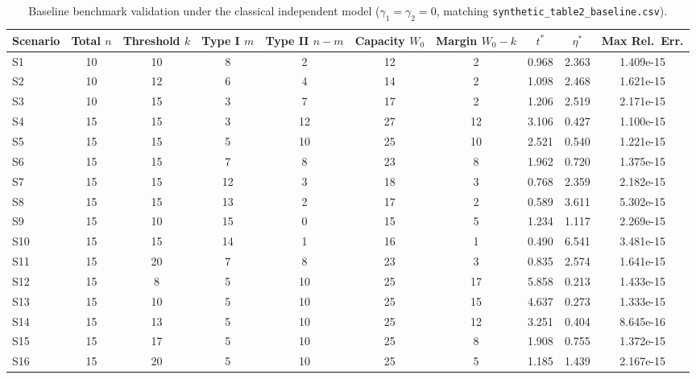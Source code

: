 \documentclass[10pt,a4paper]{article}
\begin{document}
\begin{table}[htbp]
\centering
\footnotesize
\caption{Baseline benchmark validation under the classical independent model ($\gamma_1 = \gamma_2 = 0$, matching \texttt{synthetic\_table2\_baseline.csv}).}
\label{tab:S1}
\begin{tabular*}{\textwidth}{@{\extracolsep{\fill}}lccccccccc@{}}
\toprule
Scenario & Total $n$ & Threshold $k$ & Type I $m$ & Type II $n-m$ & Capacity $W_0$ & Margin $W_0-k$ & $t^*$ & $\eta^*$ & Max Rel.\ Err. \\
\midrule
S1  & 10 & 10 &  8 &  2 & 12 &  2 & 0.968 & 2.363 & 1.409e-15 \\
S2  & 10 & 12 &  6 &  4 & 14 &  2 & 1.098 & 2.468 & 1.621e-15 \\
S3  & 10 & 15 &  3 &  7 & 17 &  2 & 1.206 & 2.519 & 2.171e-15 \\
S4  & 15 & 15 &  3 & 12 & 27 & 12 & 3.106 & 0.427 & 1.100e-15 \\
S5  & 15 & 15 &  5 & 10 & 25 & 10 & 2.521 & 0.540 & 1.221e-15 \\
S6  & 15 & 15 &  7 &  8 & 23 &  8 & 1.962 & 0.720 & 1.375e-15 \\
S7  & 15 & 15 & 12 &  3 & 18 &  3 & 0.768 & 2.359 & 2.182e-15 \\
S8  & 15 & 15 & 13 &  2 & 17 &  2 & 0.589 & 3.611 & 5.302e-15 \\
S9  & 15 & 10 & 15 &  0 & 15 &  5 & 1.234 & 1.117 & 2.269e-15 \\
S10 & 15 & 15 & 14 &  1 & 16 &  1 & 0.490 & 6.541 & 3.481e-15 \\
S11 & 15 & 20 &  7 &  8 & 23 &  3 & 0.835 & 2.574 & 1.641e-15 \\
S12 & 15 &  8 &  5 & 10 & 25 & 17 & 5.858 & 0.213 & 1.433e-15 \\
S13 & 15 & 10 &  5 & 10 & 25 & 15 & 4.637 & 0.273 & 1.333e-15 \\
S14 & 15 & 13 &  5 & 10 & 25 & 12 & 3.251 & 0.404 & 8.645e-16 \\
S15 & 15 & 17 &  5 & 10 & 25 &  8 & 1.908 & 0.755 & 1.372e-15 \\
S16 & 15 & 20 &  5 & 10 & 25 &  5 & 1.185 & 1.439 & 2.167e-15 \\
\bottomrule
\end{tabular*}
\end{table}
\end{document}
